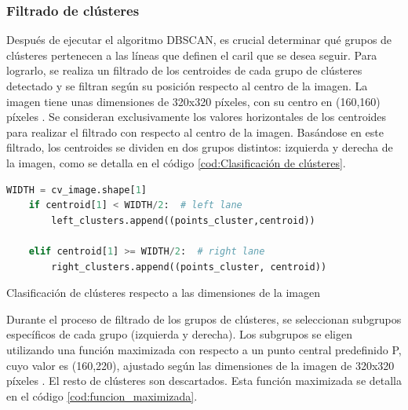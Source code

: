 \subsubsection{Filtrado de clústeres}
\label{clasificación:cluster}
Después de ejecutar el algoritmo DBSCAN, es crucial determinar qué grupos de clústeres pertenecen a las líneas que definen el caril que se desea seguir. 
Para lograrlo, se realiza un filtrado de los centroides de cada
grupo de clústeres detectado y se filtran según su posición respecto al centro de la imagen. La imagen tiene unas dimensiones de 320x320 píxeles, con su centro en (160,160) píxeles 
. Se consideran exclusivamente los valores horizontales de los centroides para realizar el filtrado con respecto al centro de la imagen. Basándose en este filtrado, 
los centroides se dividen en dos grupos distintos: izquierda y derecha de la imagen, como se detalla en el código \ref{cod:Clasificación de clústeres}. \newline

\begin{code}[h]
  \begin{lstlisting}[language=Python]
    WIDTH = cv_image.shape[1]
    if centroid[1] < WIDTH/2:  # left lane
        left_clusters.append((points_cluster,centroid))
       
    elif centroid[1] >= WIDTH/2:  # right lane
        right_clusters.append((points_cluster, centroid))
  \end{lstlisting}
  \caption[Clasificación de clústeres según las dimensiones de la imagen ]{Clasificación de clústeres respecto a las dimensiones de la imagen}
  \label{cod:Clasificación de clústeres}
  \end{code}  

Durante el proceso de filtrado de los grupos de clústeres, se seleccionan subgrupos específicos de cada grupo (izquierda y derecha). Los subgrupos se eligen utilizando una función 
maximizada con respecto a un punto central predefinido P, cuyo valor es (160,220), ajustado según las dimensiones de la imagen de 320x320 píxeles . El resto de clústeres son 
descartados. Esta función maximizada se detalla en el código \ref{cod:funcion_maximizada}. 

